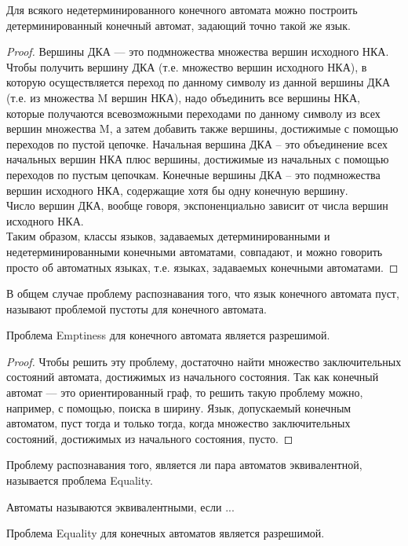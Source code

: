 
    \begin{Thm}
        Для всякого недетерминированного конечного автомата можно построить детерминированный конечный автомат, задающий точно такой же язык. 
    \end{Thm}
    \begin{proof}
        Вершины ДКА --- это подмножества множества вершин исходного НКА. Чтобы получить вершину ДКА (т.е. множество вершин исходного НКА), в которую осуществляется переход по данному символу из данной вершины ДКА (т.е. из множества M вершин НКА), надо объединить все вершины НКА, которые получаются всевозможными переходами по данному символу из всех вершин множества M, а затем добавить также вершины, достижимые с помощью переходов по пустой цепочке. Начальная вершина ДКА -- это объединение всех начальных вершин НКА плюс вершины, достижимые из начальных с помощью переходов по пустым цепочкам. Конечные вершины ДКА -- это подмножества вершин исходного НКА, содержащие хотя бы одну конечную вершину.\\
        Число вершин ДКА, вообще говоря, экспоненциально зависит от числа вершин исходного НКА.\\
        Таким образом, классы языков, задаваемых детерминированными и недетерминированными конечными автоматами, совпадают, и можно говорить просто об автоматных языках, т.е. языках, задаваемых конечными автоматами.
    \end{proof} 

    
    \begin{Def}
         В общем случае проблему распознавания того, что язык конечного автомата пуст, называют проблемой пустоты для конечного автомата. 
    \end{Def}
    \begin{Thm}
        Проблема Emptiness для конечного автомата является разрешимой.
    \end{Thm}
    \begin{proof}
        Чтобы решить эту проблему, достаточно найти множество заключительных состояний автомата, достижимых из начального состояния. Так как конечный автомат — это ориентированный граф, то решить такую проблему можно, например, с помощью, поиска в ширину. Язык, допускаемый конечным автоматом, пуст тогда и только тогда, когда множество заключительных состояний, достижимых из начального состояния, пусто.
    \end{proof}
    \begin{Def}
        Проблему распознавания того, является ли пара автоматов эквивалентной, называется проблема Equality.
    \end{Def}
    \begin{Rem}
        Автоматы называются эквивалентными, если ...
    \end{Rem}
    \begin{Thm}
        Проблема Equality для конечных автоматов является разрешимой.
    \end{Thm}


